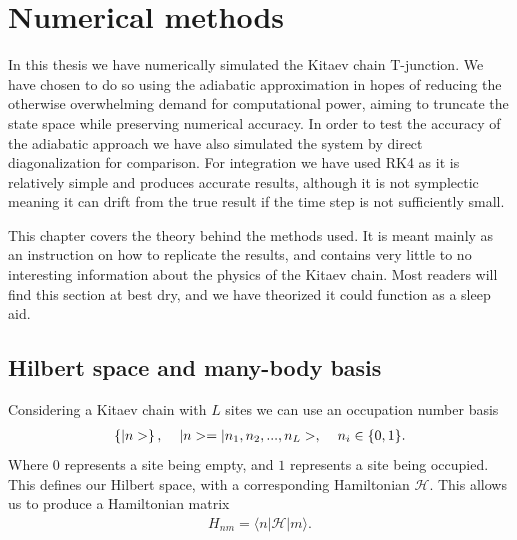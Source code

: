 \chapter{Numerical methods}
In this thesis we have numerically simulated the Kitaev chain T-junction. We have chosen to do so using the adiabatic approximation in hopes of reducing the otherwise overwhelming demand for computational power, aiming to truncate the state space while preserving numerical accuracy. In order to test the accuracy of the adiabatic approach we have also simulated the system by direct diagonalization for comparison. For integration we have used RK4 as it is relatively simple and produces accurate results, although it is not symplectic meaning it can drift from the true result if the time step is not sufficiently small.

This chapter covers the theory behind the methods used. It is meant mainly as an instruction on how to replicate the results, and contains very little to no interesting information about the physics of the Kitaev chain. Most readers will find this section at best dry, and we have theorized it could function as a sleep aid.

\section{Hilbert space and many-body basis}
Considering a Kitaev chain with $L$ sites we can use an occupation number basis
\begin{align}
    \left\{ |n\rangle \right\}, \hspace{4mm} |n\rangle = |n_1, n_2, ..., n_L\rangle, \hspace{4mm} n_i \in \{0,1\}.
\end{align}
Where $0$ represents a site being empty, and $1$ represents a site being occupied. This defines our Hilbert space, with a corresponding Hamiltonian $\mathcal{H}$. This allows us to produce a Hamiltonian matrix 
\begin{align}
    H_{nm} = \langle n | \mathcal{H} |m\rangle.
\end{align}

